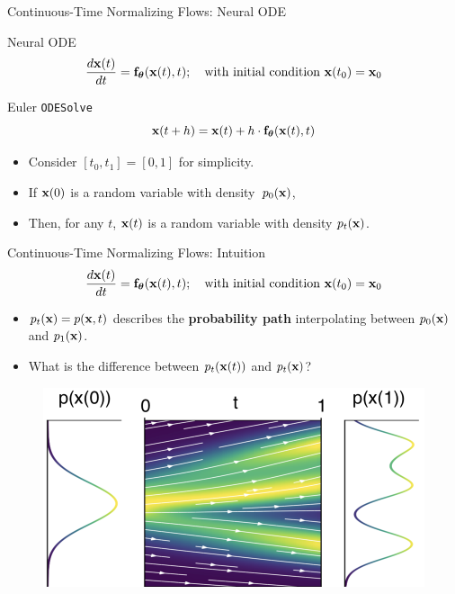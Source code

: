 \documentclass{beamer}
\begin{document}
\begin{frame}{Continuous-Time Normalizing Flows: Neural ODE}
	\begin{block}{Neural ODE}
		\vspace{-0.2cm}
		\[
  			\frac{d \mathbf{x}(t)}{dt} = \mathbf{f}_{\boldsymbol{\theta}}(\mathbf{x}(t), t); \quad \text{with initial condition }\mathbf{x}(t_0) = \mathbf{x}_0
		\]
		\vspace{-0.3cm}
	\end{block}
	\begin{block}{Euler \texttt{ODESolve}}
		\vspace{-0.3cm}
		\[
		    \mathbf{x}(t + h) = \mathbf{x}(t) + h \cdot \mathbf{f}_{\boldsymbol{\theta}}(\mathbf{x}(t), t)
		\]
		\vspace{-0.5cm}
	\end{block}
	\eqpause
	\begin{itemize}
		\item Consider $[t_0, t_1] = [0, 1]$ for simplicity.
		\item If $\mathbf{x}(0)$ is a random variable with density~$p_0(\mathbf{x})$,
		\item Then, for any $t$, $\mathbf{x}(t)$ is a random variable with density $p_t(\mathbf{x})$.
	\end{itemize}
\end{frame}
\begin{frame}{Continuous-Time Normalizing Flows: Intuition}
	\[
 		\frac{d \mathbf{x}(t)}{dt} = \mathbf{f}_{\boldsymbol{\theta}}(\mathbf{x}(t), t); \quad \text{with initial condition }\mathbf{x}(t_0) = \mathbf{x}_0
	\]
	\eqpause
	\vspace{-0.5cm}
	\begin{itemize}
		\item $p_t(\mathbf{x}) = p(\mathbf{x}, t)$ describes the \textbf{probability path} interpolating between $p_0(\mathbf{x})$ and $p_1(\mathbf{x})$.
		\item {\color{gray}What is the difference between $p_t(\mathbf{x}(t))$ and $p_t(\mathbf{x})$?}
	\end{itemize}
	\eqpause
	\begin{figure}
		\centering
		\includegraphics[width=0.75\linewidth]{figs/cnf_flow.png}
	\end{figure}
\end{frame}
\end{document}
